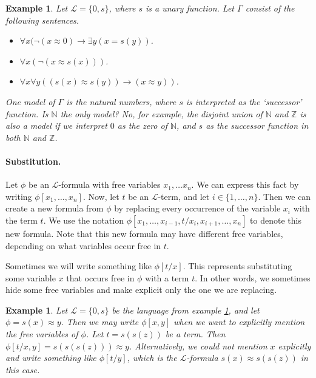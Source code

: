 \documentclass{article}
\theoremstyle{plain}
\newtheorem{example}[theorem]{Example}{\bfseries}{\upshape}
\newcommand{\bN}{\mathbb{N}}
\newcommand{\bZ}{\mathbb{Z}}
\newcommand{\sL}{\mathscr{L}}
\begin{document}
\begin{example}\label{E:nums}
Let $\sL=\{0,s\}$, where $s$ is a unary function. Let $\Gamma$ consist of the following sentences.
\begin{itemize}
\item[$\phi_1$:] $\forall x (\neg (x\approx 0)\rightarrow \exists y (x= s(y))$.
\item[$\phi_2$:] $\forall x (\neg (x\approx s(x)))$. 
\item[$\phi_3$:] $\forall x\forall y ((s(x)\approx s(y))\rightarrow (x\approx y))$. 
\end{itemize}
One model of $\Gamma$ is the natural numbers, where $s$ is interpreted as the `successor' function. Is $\bN$ the only model? No, for example, the disjoint union of $\bN$ and $\bZ$ is also a model if we interpret $0$ as the zero of $\bN$, and $s$ as the successor function in both $\bN$ and $\bZ$. 
\end{example}

\paragraph{Substitution.}
Let $\phi$ be an $\sL$-formula with free variables $x_1,\ldots x_n$. We can express this fact by writing $\phi[x_1,\ldots,x_n]$. Now, let $t$ be an $\sL$-term, and let $i\in \{1,\ldots,n\}$. Then we can create a new formula from $\phi$ by replacing every occurrence of the variable $x_i$ with the term $t$. We use the notation $\phi[x_1,\ldots,x_{i-1},t/x_i,x_{i+1},\ldots,x_n]$ to denote this new formula. Note that this new formula may have different free variables, depending on what variables occur free in $t$.

Sometimes we will write something like $\phi[t/x]$. This represents substituting some variable $x$ that occurs free in $\phi$ with a term $t$. In other words, we sometimes hide some free variables and make explicit only the one we are replacing. 

\begin{example}
Let $\sL=\{0,s\}$ be the language from example \ref{E:nums}, and let $\phi = s(x)\approx y$. Then we may write $\phi[x,y]$ when we want to explicitly mention the free variables of $\phi$. Let $t = s(s(z))$ be a term. Then $\phi[t/x,y]= s(s(s(z)))\approx y$. Alternatively, we could not mention $x$ explicitly and write something like $\phi[t/y]$, which is the $\sL$-formula $s(x)\approx s(s(z))$ in this case.
\end{example}  
\end{document}
